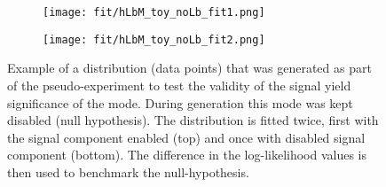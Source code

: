 \begin{figure}[htbp]
    \centering
    \begin{subfigure}[b]{\textwidth}
        \centering
        \texttt{[image: fit/hLbM\_toy\_noLb\_fit1.png]}
    \end{subfigure}
    \par\bigskip 
    \begin{subfigure}[b]{\textwidth}
        \centering
        \texttt{[image: fit/hLbM\_toy\_noLb\_fit2.png]}
    \end{subfigure}
    \caption{Example of a distribution (data points) that was generated as part of the pseudo-experiment to test the validity of the signal yield significance of the \decay{\Lb}{\Dz\Lz} mode. During generation this mode was kept disabled (null hypothesis). The distribution is fitted twice, first with the \Lb signal component enabled (top) and once with disabled \Lb signal component (bottom). The difference in the log-likelihood values is then used to benchmark the null-hypothesis.}
    \label{fig:fit_hLbM_toy_noLb}
\end{figure}

